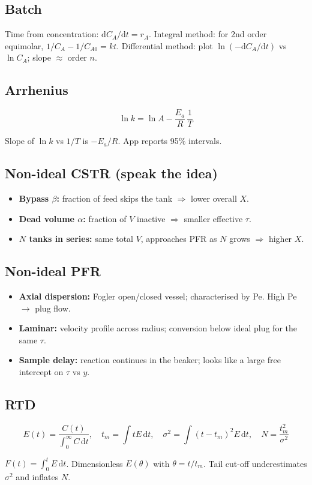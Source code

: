 \documentclass[11pt,a4paper]{article}
\begin{document}
\subsection{Batch}
Time from concentration: \(\mathrm{d}C_A/\mathrm{d}t = r_A\). Integral method: for 2nd order equimolar,
\(1/C_A - 1/C_{A0} = k t\). Differential method: plot \(\ln(-\mathrm{d}C_A/\mathrm{d}t)\) vs \(\ln C_A\); slope \(\approx\) order \(n\).

\subsection{Arrhenius}
\begin{eqbox}
\[
\ln k = \ln A - \frac{E_a}{R}\,\frac{1}{T}
\]
\end{eqbox}
Slope of \(\ln k\) vs \(1/T\) is \(-E_a/R\). App reports 95\% intervals.

\subsection{Non-ideal CSTR (speak the idea)}
\begin{itemize}
  \item \textbf{Bypass \(\beta\):} fraction of feed skips the tank \(\Rightarrow\) lower overall \(X\).
  \item \textbf{Dead volume \(\alpha\):} fraction of \(V\) inactive \(\Rightarrow\) smaller effective \(\tau\).
  \item \textbf{\(N\) tanks in series:} same total \(V\), approaches PFR as \(N\) grows \(\Rightarrow\) higher \(X\).
\end{itemize}

\subsection{Non-ideal PFR}
\begin{itemize}
  \item \textbf{Axial dispersion:} Fogler open/closed vessel; characterised by Pe. High Pe \(\to\) plug flow.
  \item \textbf{Laminar:} velocity profile across radius; conversion below ideal plug for the same \(\tau\).
  \item \textbf{Sample delay:} reaction continues in the beaker; looks like a large free intercept on \(\tau\) vs \(y\).
\end{itemize}

\subsection{RTD}
\begin{eqbox}
\[
E(t)=\frac{C(t)}{\int_0^\infty C\,\mathrm{d}t},\quad
t_m=\int t E\,\mathrm{d}t,\quad
\sigma^2=\int (t-t_m)^2 E\,\mathrm{d}t,\quad
N=\frac{t_m^2}{\sigma^2}
\]
\end{eqbox}
\(F(t)=\int_0^t E\,\mathrm{d}t\). Dimensionless \(E(\theta)\) with \(\theta=t/t_m\). Tail cut-off underestimates \(\sigma^2\)
and inflates \(N\).
\end{document}
